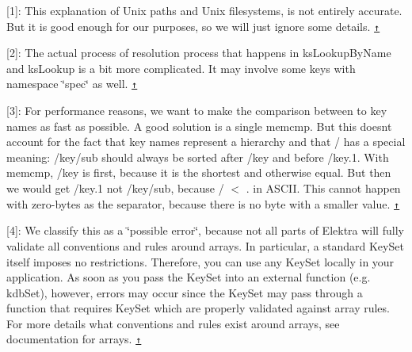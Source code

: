 \mbox{[}1\mbox{]}\+: This explanation of Unix paths and Unix filesystems, is not entirely accurate. But it is good enough for our purposes, so we will just ignore some details. \href{#ref-footnote-1}{\tt ↑}

\mbox{[}2\mbox{]}\+: The actual process of resolution process that happens in {\ttfamily ks\+Lookup\+By\+Name} and {\ttfamily ks\+Lookup} is a bit more complicated. It may involve some keys with namespace \char`\"{}spec\char`\"{} as well. \href{#ref-footnote-2}{\tt ↑}

\mbox{[}3\mbox{]}\+: For performance reasons, we want to make the comparison between to key names as fast as possible. A good solution is a single {\ttfamily memcmp}. But this doesn\textquotesingle{}t account for the fact that key names represent a hierarchy and that {\ttfamily /} has a special meaning\+: {\ttfamily /key/sub} should always be sorted after {\ttfamily /key} and before {\ttfamily /key.1}. With {\ttfamily memcmp}, {\ttfamily /key} is first, because it is the shortest and otherwise equal. But then we would get {\ttfamily /key.1} not {\ttfamily /key/sub}, because {\ttfamily / $<$ .} in A\+S\+C\+II. This cannot happen with zero-\/bytes as the separator, because there is no byte with a smaller value. \href{#ref-footnote-3}{\tt ↑}

\mbox{[}4\mbox{]}\+: We classify this as a \char`\"{}possible error\char`\"{}, because not all parts of Elektra will fully validate all conventions and rules around arrays. In particular, a standard {\ttfamily Key\+Set} itself imposes no restrictions. Therefore, you can use any {\ttfamily Key\+Set} locally in your application. As soon as you pass the {\ttfamily Key\+Set} into an external function (e.\+g. {\ttfamily kdb\+Set}), however, errors may occur since the {\ttfamily Key\+Set} may pass through a function that requires {\ttfamily Key\+Set} which are properly validated against array rules. For more details what conventions and rules exist around arrays, see documentation for arrays. \href{#ref-footnote-4}{\tt ↑} 
